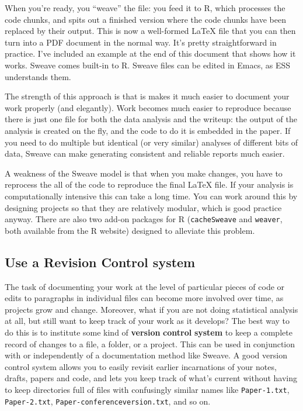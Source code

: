 \documentclass[11pt,article,oneside]{memoir}
\begin{document}
When you're ready, you ``weave'' the file: you feed it to R, which processes the code chunks, and spits out a finished version where the code chunks have been replaced by their output. This is now a well-formed LaTeX file that you can then turn into a PDF document in the normal way. It's pretty straightforward in practice. I've included an example at the end of this document that shows how it works. Sweave comes built-in to R. Sweave files can be edited in Emacs, as ESS understands them. 

The strength of this approach is that is makes it much easier to document your work properly (and elegantly). Work becomes much easier to reproduce because there is just one file for both the data analysis and the writeup: the output of the analysis is created on the fly, and the code to do it is embedded in the paper. If you need to do multiple but identical (or very similar) analyses of different bits of data, Sweave can make generating consistent and reliable reports much easier.

A weakness of the Sweave model is that when you make changes, you have to reprocess the all of the code to reproduce the final LaTeX file. If your analysis is computationally intensive this can take a long time. You can work around this by designing  projects so that they are relatively modular, which is good practice anyway. There are also two add-on packages for R (\texttt{cacheSweave} and \texttt{weaver}, both available from the R website) designed to alleviate this problem. 

\subsection{Use a Revision Control system}
The task of documenting your work at the level of particular pieces of code or edits to paragraphs in individual files can become more involved over time, as projects grow and change. Moreover, what if you are not doing statistical analysis at all, but still want to keep track of your work as it develops? The best way to do this is to institute some kind of \textbf{version} \textbf{control} \textbf{system} to keep a complete record of changes to a file, a folder, or a project. This can be used in conjunction with or independently of a documentation method like Sweave. A good version control system allows you to easily revisit earlier incarnations of your notes, drafts, papers and code, and lets you keep track of what's current without having to keep directories full of files with confusingly similar names like \texttt{Paper-1.txt}, \texttt{Paper-2.txt}, \texttt{Paper-conferenceversion.txt}, and so on. 
\end{document}
